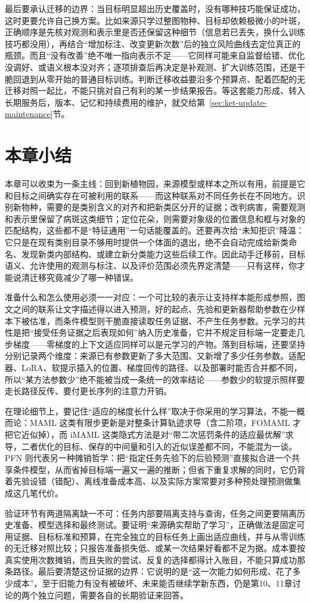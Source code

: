 最后要承认迁移的边界：当目标明显超出历史覆盖时，没有哪种技巧能保证成功，这时更要允许自己换方案。比如来源只学过整图物种、目标却依赖极微小的叶斑，正确顺序是先核对观测和表示里是否还保留这种细节（信息若已丢失，换什么训练技巧都没用），再结合“增加标注、改变更新次数”后的独立风险曲线去定位真正的瓶颈。而且“没有改善”绝不唯一指向表示不足——它同样可能来自监督给错、优化没调好、或语义根本没对齐；逐项排查后再决定是补观测、扩大训练范围，还是干脆回退到从零开始的普通目标训练。判断迁移收益要沿多个预算点、配着匹配的无迁移对照一起比，不能只挑对自己有利的某一步结果报告。等这套能力形成、转入长期服务后，版本、记忆和持续费用的维护，就交给第~\ref{sec:ket-update-maintenance}节。

\section{本章小结}
\label{sec:ket-transfer-summary}

本章可以收束为一条主线：回到新植物园，来源模型或样本之所以有用，前提是它和目标之间确实存在可被利用的联系——而这种联系对不同任务长在不同地方。识别新物种，需要的是类别含义的对齐和把新类区分开的证据；改判病害，需要观测和表示里保留了病斑这类细节；定位花朵，则需要对象级的位置信息和框与对象的匹配结构，这些都不是“特征通用”一句话能覆盖的。还要再次给“未知拒识”降温：它只是在现有类别目录不够用时提供一个体面的退出，绝不会自动完成给新类命名、发现新类内部结构、或建立新分类能力这些后续工作。因此动手迁移前，目标语义、允许使用的观测与标注、以及评价范围必须先界定清楚——只有这样，你才能说清迁移究竟减少了哪一种错误。

准备什么和怎么使用必须一一对应：一个可比较的表示让支持样本能形成参照，图文之间的联系让文字描述得以进入预测，好的起点、先验和更新器帮助参数在少样本下被估准，而条件模型则干脆直接读取任务证据、不产生任务参数。元学习的共性是把“接受任务证据之后表现如何”纳入历史准备，它并不规定目标端一定要走几步梯度——零梯度的上下文适应同样可以是元学习的产物。落到目标端，还要坚持分别记录两个维度：来源已有参数更新了多大范围、又新增了多少任务参数。适配器、LoRA、软提示插入的位置、梯度回传的路径、以及部署时能否合并都不同，所以“某方法参数少”绝不能被当成一条统一的效率结论——参数少的软提示照样要走长路径反传、要付更长序列的注意力开销。

在理论细节上，要记住“适应的梯度长什么样”取决于你采用的学习算法，不能一概而论：MAML 这类有限步更新是对整条计算轨迹求导（含二阶项，FOMAML 才把它近似掉），而 iMAML 这类隐式方法是对“带二次惩罚条件的适应最优解”求导，二者优化的目标、保存的中间量和引入的近似误差都不同，不能混为一谈。PFN 则代表另一种摊销哲学：把“指定任务先验下的后验预测”直接拟合进一个共享条件模型，从而省掉目标端一遍又一遍的推断；但省下重复求解的同时，它仍背着先验设错（错配）、离线准备成本高、以及实际方案常要对多种预处理预测做集成这几笔代价。

验证环节有两道隔离缺一不可：任务内部要隔离支持与查询，任务之间更要隔离历史准备、模型选择和最终测试。要证明“来源确实帮助了学习”，正确做法是固定可用证据、目标标准和预算，在完全独立的目标任务上画出适应曲线，并与从零训练的无迁移对照比较；只报告准备损失低、或某一次结果好看都不足为据。成本要按真实使用次数摊销，而且失败的尝试、反复的选择都得计入账目，不能只算成功那条路径。最后要清楚这份证据的边界：它说明的是“这一次能力如何形成、花了多少成本”，至于旧能力有没有被破坏、未来能否继续学新东西，仍是第10、11章讨论的两个独立问题，需要各自的长期验证来回答。
